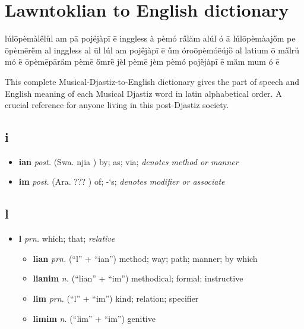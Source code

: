 

\section{Lawntoklian to English dictionary}

lúlōpèmàle̋lȕl am pā poje̋jàpī ē inggless à pèmó ra̋la̋m alúl ó ā lúlōpèmàajőm pe ōpèmēre̋m al inggless al ūl lúl am poje̋jàpī ē űm óroōpèmóēújȍ al latium ō ma̋lrȕ mó ȅ ōpèmēpāra̋m pèmē őmrȅ jèl pèmē jèm pèmó poje̋jàpī ē mȁm mum ó ē

This complete Musical-Djastiz-to-English dictionary gives the part of speech and English meaning of each Musical Djastiz word in latin alphabetical order. A crucial reference for anyone living in this post-Djastiz society.

\subsection{i}
\begin{itemize}

	\item \textbf{ian} \textit{post.} (Swa. \langle njia \rangle [ˈᶮɟia]) by; as; via; \textit{denotes method or manner}

	\item \textbf{im} \textit{post.} (Ara. \langle ??? \rangle [im]) of; -`s; \textit{denotes modifier or associate}

\end{itemize}

\subsection{l}
\begin{itemize}

	\item \textbf{l} \textit{prn.} which; that; \textit{relative}
	\begin{itemize}
		\item \textbf{lian} \textit{prn.} (``l'' + ``ian'') method; way; path; manner; by which
		\item \textbf{lianim} \textit{n.} (``lian'' + ``im'') methodical; formal; instructive
		\item \textbf{lim} \textit{prn.} (``l'' + ``im'') kind; relation; specifier
		\item \textbf{limim} \textit{n.} (``lim'' + ``im'') genitive
	\end{itemize}

\end{itemize}

